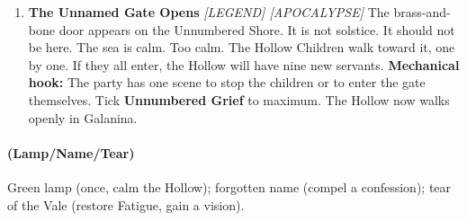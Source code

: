 \begin{enumerate}
\item[A] \textbf{The Unnamed Gate Opens} \hfill \textit{[LEGEND] [APOCALYPSE]}  
  The brass-and-bone door appears on the Unnumbered Shore. It is not solstice. It should not be here. The sea is calm. Too calm. The Hollow Children walk toward it, one by one. If they all enter, the Hollow will have nine new servants.  
  \textbf{Mechanical hook:} The party has one scene to stop the children or to enter the gate themselves. Tick \textbf{Unnumbered Grief} to maximum. The Hollow now walks openly in Galanina.
\end{enumerate}

\paragraph*{(Lamp/Name/Tear)} Green lamp (once, calm the Hollow); forgotten name (compel a confession); tear of the Vale (restore Fatigue, gain a vision).


